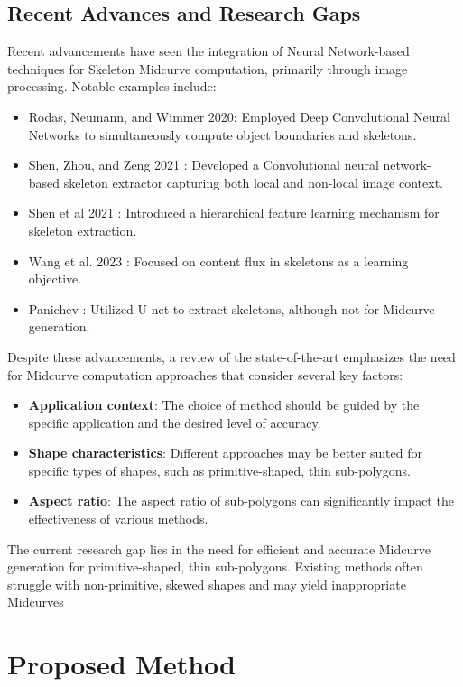 \documentclass[10pt, conference]{IEEEtran}
\begin{document}
\subsection{Recent Advances and Research Gaps}
\label{subsec:2}

Recent advancements have seen the integration of Neural Network-based techniques for Skeleton Midcurve computation, primarily through image processing. Notable examples include:
\begin{itemize}
\item Rodas, Neumann, and Wimmer 2020\cite{Rodas2019JointOB}: Employed Deep Convolutional Neural Networks to simultaneously compute object boundaries and skeletons.
\item Shen, Zhou, and Zeng 2021 \cite{shen2021convolutional}: Developed a Convolutional neural network-based skeleton extractor capturing both local and non-local image context.
\item Shen et al 2021 \cite{shen2016object}: Introduced a hierarchical feature learning mechanism for skeleton extraction.
\item Wang et al. 2023 \cite{wang2018deepflux}: Focused on content flux in skeletons as a learning objective.
\item Panichev \cite{Panichev_2019_CVPR_Workshops}: Utilized U-net to extract skeletons, although not for Midcurve generation.
\end{itemize}

Despite these advancements, a review of the state-of-the-art emphasizes the need for Midcurve computation approaches that consider several key factors:
\begin{itemize}
\item {\bf Application context}: The choice of method should be guided by the specific application and the desired level of accuracy.
\item {\bf Shape characteristics}: Different approaches may be better suited for specific types of shapes, such as primitive-shaped, thin sub-polygons.
\item {\bf Aspect ratio}: The aspect ratio of sub-polygons can significantly impact the effectiveness of various methods.
\end{itemize}
The current research gap lies in the need for efficient and accurate Midcurve generation for primitive-shaped, thin sub-polygons. Existing methods often struggle with non-primitive, skewed shapes and may yield inappropriate Midcurves


\section{Proposed Method}
\label{sec:3}
\end{document}

